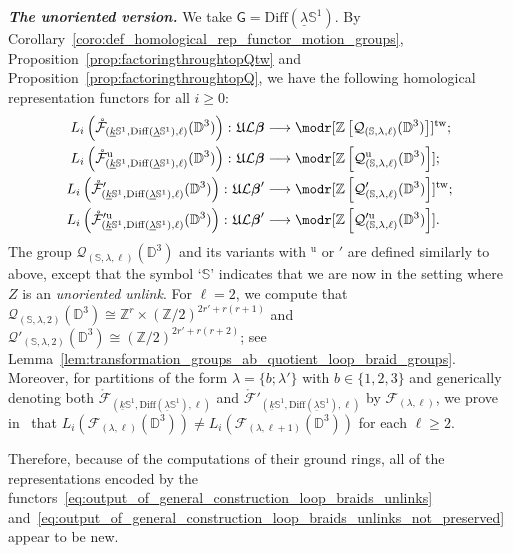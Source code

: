 \documentclass[AHL,Unicode,published]{cedram}
\newcommand{\Diff}{\mathrm{Diff}}
\newcommand{\Int}{\mathring}
\newcommand{\tw}{\mathrm{tw}}
\newcommand{\unt}{\mathrm{u}}
\newcommand{\fU}{\ensuremath{\mathfrak{U}}}
\newcommand{\sG}{\mathsf{G}}
\newcommand{\cF}{\mathcal{F}}
\newcommand{\cL}{\mathcal{L}}
\newcommand{\cQ}{\mathcal{Q}}
\newcommand{\bD}{\mathbb{D}}
\newcommand{\bS}{\mathbb{S}}
\newcommand{\bZ}{\mathbb{Z}}
\newcommand{\too}{\ensuremath{\longrightarrow}}
\newcommand{\Beta}{\boldsymbol{\beta}}
\renewcommand{\geq}{\geqslant}
\begin{document}
\textbf{\emph{The unoriented version.}} We take $\sG=\Diff(\underline{\lambda}\bS^{1})$. By Corollary~\ref{coro:def_homological_rep_functor_motion_groups}, Proposition~\ref{prop:factoringthroughtopQtw} and Proposition~\ref{prop:factoringthroughtopQ}, we have the following homological representation functors for all $i\geq 0$:
\begin{equation}\label{eq:output_of_general_construction_loop_braids_unlinks_not_preserved}
\begin{split}
L_{i}\left(\Int{\cF}_{\left(\underline{k}\bS^{1},\Diff(\underline{\lambda}\bS^{1}),\ell\right)}(\bD^{3})\right)\colon\fU\cL\Beta &\too \modr[\bZ\left[\cQ_{(\bS,\lambda,\ell)}(\bD^{3})\right]]^{\tw};\\
L_{i}\left(\Int{\cF}^{\unt}_{\left(\underline{k}\bS^{1},\Diff(\underline{\lambda}\bS^{1}),\ell\right)}(\bD^{3})\right)\colon\fU\cL\Beta &\too \modr[\bZ\left[\cQ^{\unt}_{(\bS,\lambda,\ell)}(\bD^{3})\right]];\\
L_{i}\left(\Int{\cF}'_{\left(\underline{k}\bS^{1},\Diff(\underline{\lambda}\bS^{1}),\ell\right)}(\bD^{3})\right)\colon\fU\cL\Beta' &\too \modr[\bZ\left[\cQ'_{(\bS,\lambda,\ell)}(\bD^{3})\right]]^{\tw};\\
L_{i}\left(\Int{\cF}'^{\unt}_{\left(\underline{k}\bS^{1},\Diff(\underline{\lambda}\bS^{1}),\ell\right)}(\bD^{3})\right)\colon\fU\cL\Beta' &\too \modr[\bZ\left[\cQ'^{\unt}_{(\bS,\lambda,\ell)}(\bD^{3})\right]].
\end{split}
\end{equation}
The group $\cQ_{(\bS,\lambda,\ell)}(\bD^{3})$ and its variants with ${}^{\unt}$ or $'$ are defined similarly to above, except that the symbol `$\bS$' indicates that we are now in the setting where $Z$ is an \emph{unoriented unlink}. For $\ell = 2$, we compute that $\cQ_{(\bS,\lambda,2)}(\bD^{3})\cong \bZ^{r}\times (\bZ/2)^{2r'+r(r+1)}$ and $\cQ'_{(\bS,\lambda,2)}(\bD^{3})\cong (\bZ/2)^{2r'+r(r+2)}$; see Lemma~\ref{lem:transformation_groups_ab_quotient_loop_braid_groups}. Moreover, for partitions of the form $\lambda =\boldsymbol{\{}b;\lambda'\boldsymbol{\}}$ with $b\in\{1,2,3\}$ and generically denoting both $\Int{\cF}_{(\underline{k}\bS^{1},\Diff(\underline{\lambda}\bS^{1}),\ell)}$ and $\Int{\cF}'_{(\underline{k}\bS^{1},\Diff(\underline{\lambda}\bS^{1}),\ell)}$ by $\cF_{(\lambda,\ell)}$, we prove in~\cite[Prop.~6.2]{PSIN} that $L_{i}(\cF_{(\lambda,\ell)}(\bD^{3}))\neq L_{i}(\cF_{(\lambda,\ell + 1)}(\bD^{3}))$ for each $\ell \geq 2$.

Therefore, because of the computations of their ground rings, all of the representations encoded by the functors~\eqref{eq:output_of_general_construction_loop_braids_unlinks} and~\eqref{eq:output_of_general_construction_loop_braids_unlinks_not_preserved} appear to be new.
\end{document}
